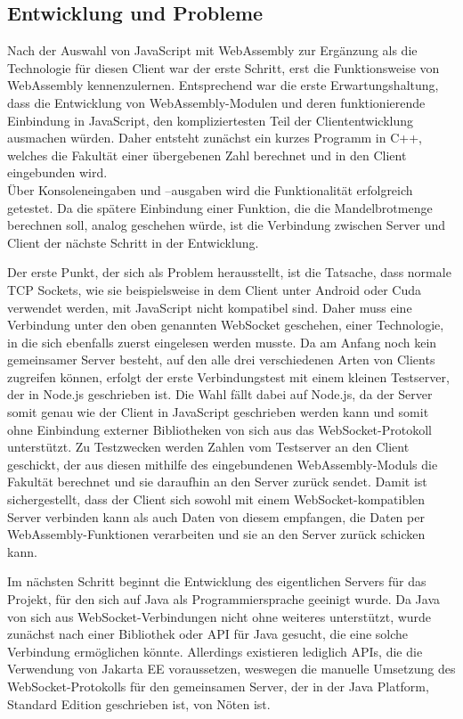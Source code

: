 \documentclass[12pt, onecolumn, notitlepage]{scrartcl}
\begin{document}
\subsection{Entwicklung und Probleme}
Nach der Auswahl von JavaScript mit WebAssembly zur Ergänzung als die Technologie für diesen Client war der erste Schritt, erst die Funktionsweise von WebAssembly kennenzulernen. Entsprechend war die erste Erwartungshaltung, dass die Entwicklung von WebAssembly-Modulen und deren funktionierende Einbindung in JavaScript, den kompliziertesten Teil der Cliententwicklung ausmachen würden. Daher entsteht zunächst ein kurzes Programm in C++, welches die Fakultät einer übergebenen Zahl berechnet und in den Client eingebunden wird. \\
Über Konsoleneingaben und –ausgaben wird die Funktionalität erfolgreich getestet. Da die spätere Einbindung einer Funktion, die die Mandelbrotmenge berechnen soll, analog geschehen würde, ist die Verbindung zwischen Server und Client der nächste Schritt in der Entwicklung. \par

Der erste Punkt, der sich als Problem herausstellt, ist die Tatsache, dass normale TCP Sockets, wie sie beispielsweise in dem Client unter Android oder Cuda verwendet werden, mit JavaScript nicht kompatibel sind. Daher muss eine Verbindung unter den oben genannten WebSocket geschehen, einer Technologie, in die sich ebenfalls zuerst eingelesen werden musste. Da am Anfang noch kein gemeinsamer Server besteht, auf den alle drei verschiedenen Arten von Clients zugreifen können, erfolgt der erste Verbindungstest mit einem kleinen Testserver, der in Node.js geschrieben ist. Die Wahl fällt dabei auf Node.js, da der Server somit genau wie der Client in JavaScript geschrieben werden kann und somit ohne Einbindung externer Bibliotheken von sich aus das WebSocket-Protokoll unterstützt. Zu Testzwecken werden Zahlen vom Testserver an den Client geschickt, der aus diesen mithilfe des eingebundenen WebAssembly-Moduls die Fakultät berechnet und sie daraufhin an den Server zurück sendet. Damit ist sichergestellt, dass der Client sich sowohl mit einem WebSocket-kompatiblen Server verbinden kann als auch Daten von diesem empfangen, die Daten per WebAssembly-Funktionen verarbeiten und sie an den Server zurück schicken kann. \par

Im nächsten Schritt beginnt die Entwicklung des eigentlichen Servers für das Projekt, für den sich auf Java als Programmiersprache geeinigt wurde. Da Java von sich aus WebSocket-Verbindungen nicht ohne weiteres unterstützt, wurde zunächst nach einer Bibliothek oder API für Java gesucht, die eine solche Verbindung ermöglichen könnte. Allerdings existieren lediglich APIs, die die Verwendung von Jakarta EE voraussetzen, weswegen die manuelle Umsetzung des WebSocket-Protokolls für den gemeinsamen Server, der in der Java Platform, Standard Edition geschrieben ist, von Nöten ist. \par
\end{document}
